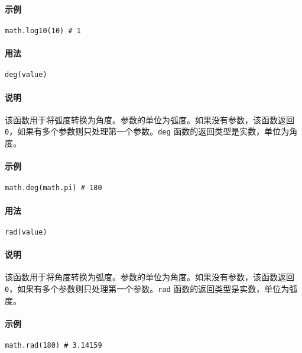 \paragraph{示例}
\begin{lstlisting}[language=berry, numbers=none]
math.log10(10) # 1
\end{lstlisting}


\paragraph{用法}
\begin{lstlisting}[language=berry, numbers=none]
deg(value)
\end{lstlisting}

\paragraph{说明}
该函数用于将弧度转换为角度。参数的单位为弧度。如果没有参数，该函数返回 \texttt{0}，如果有多个参数则只处理第一个参数。\texttt{deg} 函数的返回类型是实数，单位为角度。

\paragraph{示例}
\begin{lstlisting}[language=berry, numbers=none]
math.deg(math.pi) # 180
\end{lstlisting}


\paragraph{用法}
\begin{lstlisting}[language=berry, numbers=none]
rad(value)
\end{lstlisting}

\paragraph{说明}
该函数用于将角度转换为弧度。参数的单位为角度。如果没有参数，该函数返回 \texttt{0}，如果有多个参数则只处理第一个参数。\texttt{rad} 函数的返回类型是实数，单位为弧度。

\paragraph{示例}
\begin{lstlisting}[language=berry, numbers=none]
math.rad(180) # 3.14159
\end{lstlisting}

